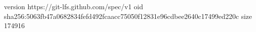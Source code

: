 version https://git-lfs.github.com/spec/v1
oid sha256:5063fb47a0682834fefd492fcaacc75050f12831e96cdbee2640c17499ed220c
size 174916
